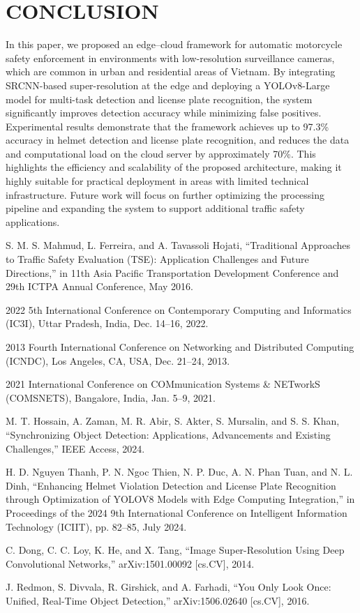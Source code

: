 \documentclass[conference]{IEEEtran}
\begin{document}
\section{CONCLUSION}

In this paper, we proposed an edge–cloud framework for automatic motorcycle safety enforcement in environments with low-resolution surveillance cameras, which are common in urban and residential areas of Vietnam. By integrating SRCNN-based super-resolution at the edge and deploying a YOLOv8-Large model for multi-task detection and license plate recognition, the system significantly improves detection accuracy while minimizing false positives. Experimental results demonstrate that the framework achieves up to 97.3\% accuracy in helmet detection and license plate recognition, and reduces the data and computational load on the cloud server by approximately 70\%. This highlights the efficiency and scalability of the proposed architecture, making it highly suitable for practical deployment in areas with limited technical infrastructure. Future work will focus on further optimizing the processing pipeline and expanding the system to support additional traffic safety applications.

\begin{thebibliography}{1}

S. M. S. Mahmud, L. Ferreira, and A. Tavassoli Hojati, “Traditional Approaches to Traffic Safety Evaluation (TSE): Application Challenges and Future Directions,” in 11th Asia Pacific Transportation Development Conference and 29th ICTPA Annual Conference, May 2016.

2022 5th International Conference on Contemporary Computing and Informatics (IC3I), Uttar Pradesh, India, Dec. 14–16, 2022.

2013 Fourth International Conference on Networking and Distributed Computing (ICNDC), Los Angeles, CA, USA, Dec. 21–24, 2013.

2021 International Conference on COMmunication Systems \& NETworkS (COMSNETS), Bangalore, India, Jan. 5–9, 2021.

M. T. Hossain, A. Zaman, M. R. Abir, S. Akter, S. Mursalin, and S. S. Khan, “Synchronizing Object Detection: Applications, Advancements and Existing Challenges,” IEEE Access, 2024.

H. D. Nguyen Thanh, P. N. Ngoc Thien, N. P. Duc, A. N. Phan Tuan, and N. L. Dinh, “Enhancing Helmet Violation Detection and License Plate Recognition through Optimization of YOLOV8 Models with Edge Computing Integration,” in Proceedings of the 2024 9th International Conference on Intelligent Information Technology (ICIIT), pp. 82–85, July 2024.

C. Dong, C. C. Loy, K. He, and X. Tang, “Image Super-Resolution Using Deep Convolutional Networks,” arXiv:1501.00092 [cs.CV], 2014.

J. Redmon, S. Divvala, R. Girshick, and A. Farhadi, “You Only Look Once: Unified, Real-Time Object Detection,” arXiv:1506.02640 [cs.CV], 2016.

\end{thebibliography}
\end{document}
